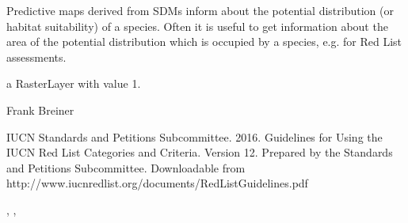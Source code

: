 \documentclass[a4paper]{book}
\begin{document}
%
\begin{Details}\relax
Predictive maps derived from SDMs inform about the potential distribution (or habitat suitability) of a species. Often it is useful to get information about the area of the potential distribution which is occupied by a species, e.g. for Red List assessments.
\end{Details}
%
\begin{Value}
a RasterLayer with value 1.
\end{Value}
%
\begin{Author}\relax
Frank Breiner 
\end{Author}
%
\begin{References}\relax

IUCN Standards and Petitions Subcommittee. 2016. Guidelines for Using the IUCN Red List Categories and Criteria. Version 12. Prepared by the Standards and Petitions Subcommittee. Downloadable from http://www.iucnredlist.org/documents/RedListGuidelines.pdf

\end{References}
%
\begin{SeeAlso}\relax
{}, , 
\end{SeeAlso}
%
\end{document}
